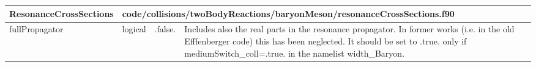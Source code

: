 \documentclass{article}
\begin{document}

\begin{longtable}{llll}
\toprule
\textbf{\large{ResonanceCrossSections}} & \multicolumn{3}{l}{\footnotesize{code/collisions/twoBodyReactions/baryonMeson/resonanceCrossSections.f90}}\\*
\midrule
\endfirsthead
\midrule
\endhead
fullPropagator & \begin{minipage}[t]{2cm}logical\end{minipage} & \begin{minipage}[t]{2cm}.false.\end{minipage} & \begin{minipage}[t]{12cm}Includes also the real parts in the resonance propagator. In former works (i.e. in the old Efffenberger code) this has been neglected. It should be set to .true. only if mediumSwitch\_coll=.true. in the namelist width\_Baryon.\end{minipage}\\*
\bottomrule
\end{longtable}
{ }



\end{document}
